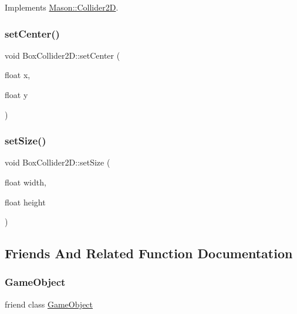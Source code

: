Implements \hyperlink{class_mason_1_1_collider2_d_a3394739f1fea805691ac2753a9272156}{Mason\+::\+Collider2D}.

\hypertarget{class_mason_1_1_box_collider2_d_aa2c5bb9d3f7e0c64f8784dce237676b4}{}\label{class_mason_1_1_box_collider2_d_aa2c5bb9d3f7e0c64f8784dce237676b4} 
\subsubsection{\texorpdfstring{set\+Center()}{setCenter()}}
{\footnotesize\ttfamily void Box\+Collider2\+D\+::set\+Center (\begin{DoxyParamCaption}\item[{float}]{x,  }\item[{float}]{y }\end{DoxyParamCaption})}

\hypertarget{class_mason_1_1_box_collider2_d_af6ee6df0351c4a59b344a274626b032d}{}\label{class_mason_1_1_box_collider2_d_af6ee6df0351c4a59b344a274626b032d} 
\subsubsection{\texorpdfstring{set\+Size()}{setSize()}}
{\footnotesize\ttfamily void Box\+Collider2\+D\+::set\+Size (\begin{DoxyParamCaption}\item[{float}]{width,  }\item[{float}]{height }\end{DoxyParamCaption})}



\subsection{Friends And Related Function Documentation}
\hypertarget{class_mason_1_1_box_collider2_d_a00df87c957d8f7ee0fc51f07a0542f4a}{}\label{class_mason_1_1_box_collider2_d_a00df87c957d8f7ee0fc51f07a0542f4a} 
\subsubsection{\texorpdfstring{Game\+Object}{GameObject}}
{\footnotesize\ttfamily friend class \hyperlink{class_mason_1_1_game_object}{Game\+Object}\hspace{0.3cm}{\ttfamily [friend]}}



